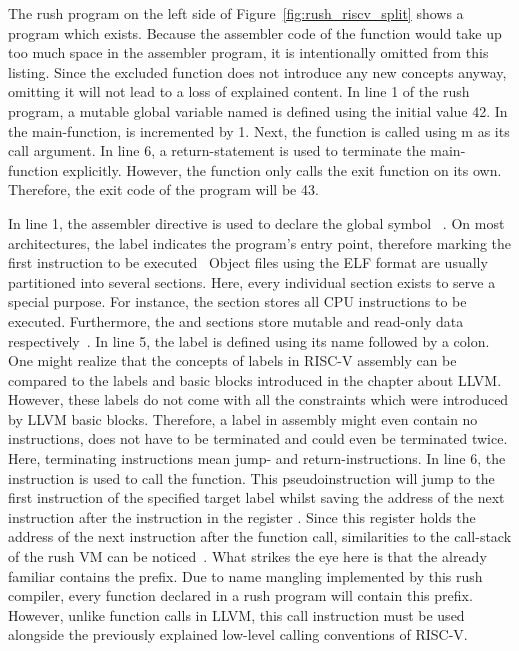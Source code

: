 The rush program on the left side of Figure~\ref{fig:rush_riscv_split} shows a program which exists.
Because the assembler code of the  function would take up too much space in the assembler program, it is intentionally omitted from this listing.
Since the excluded function does not introduce any new concepts anyway, omitting it will not lead to a loss of explained content.
In line 1 of the rush program, a mutable global variable named  is defined using the initial value 42.
In the main-function,  is incremented by 1.
Next, the  function is called using m as its call argument.
In line 6, a return-statement is used to terminate the main-function explicitly.
However, the  function only calls the exit function on its own.
Therefore, the exit code of the program will be 43.

In line 1, the  assembler directive is used to declare the global symbol ~\cite[p~.36]{Patterson2017}.
On most architectures, the  label indicates the program's entry point, therefore marking the first instruction to be executed~\cite[p.~19]{Zhirkov2017-wk}
Object files using the ELF format are usually partitioned into several sections.
Here, every individual section exists to serve a special purpose.
For instance, the  section stores all CPU instructions to be executed.
Furthermore, the  and  sections store mutable and read-only data respectively~\cite[p.~76]{Zhirkov2017-wk}.
In line 5, the  label is defined using its name followed by a colon.
One might realize that the concepts of labels in RISC-V assembly can be compared to the labels and basic blocks introduced in the chapter about LLVM.
However, these labels do not come with all the constraints which were introduced by LLVM basic blocks.
Therefore, a label in assembly might even contain no instructions, does not have to be terminated and could even be terminated twice.
Here, terminating instructions mean jump- and return-instructions.
In line 6, the  instruction is used to call the  function.
This pseudoinstruction will jump to the first instruction of the specified target label whilst saving the address of the next instruction after the  instruction in the register .
Since this register holds the address of the next instruction after the function call, similarities to the call-stack of the rush VM can be noticed~\cite[p.~22]{Patterson2017}.
What strikes the eye here is that the already familiar  contains the  prefix.
Due to name mangling implemented by this rush compiler, every function declared in a rush program will contain this prefix.
However, unlike function calls in LLVM, this call instruction must be used alongside the previously explained low-level calling conventions of RISC-V.

